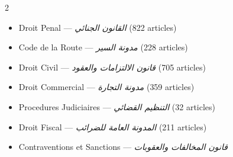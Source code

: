 \begin{multicols}{2}
\begin{itemize}
    \item Droit Penal --- \textit{\textarabic{القانون الجنائي}} (822 articles)
    \item Code de la Route --- \textit{\textarabic{مدونة السير}} (228 articles)
    \item Droit Civil --- \textit{\textarabic{قانون الالتزامات والعقود}} (705 articles)
    \item Droit Commercial --- \textit{\textarabic{مدونة التجارة}} (359 articles)
    \item Procedures Judiciaires --- \textit{\textarabic{التنظيم القضائي}} (32 articles)
    \item Droit Fiscal --- \textit{\textarabic{المدونة العامة للضرائب}} (211 articles)
    \item Contraventions et Sanctions --- \textit{\textarabic{قانون المخالفات والعقوبات}}
\end{itemize}
\end{multicols}
